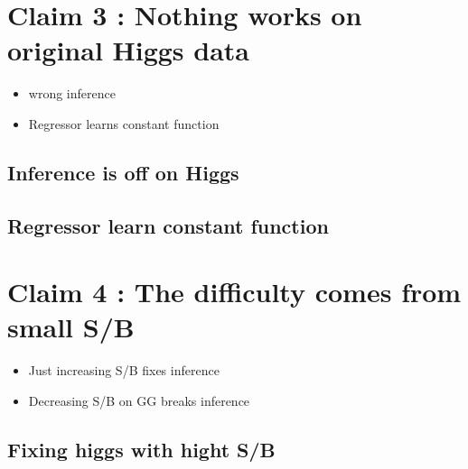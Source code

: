 










\clearpage
\section{Claim 3 : Nothing works on original Higgs data}

\begin{itemize}
  \item wrong inference
  \item Regressor learns constant function
\end{itemize}




\subsection{Inference is off on Higgs}





\subsection{Regressor learn constant function}












\clearpage
\section{Claim 4 : The difficulty comes from small S/B}

\begin{itemize}
  \item Just increasing S/B fixes inference
  \item Decreasing S/B on GG breaks inference
\end{itemize}




\subsection{Fixing higgs with hight S/B}







